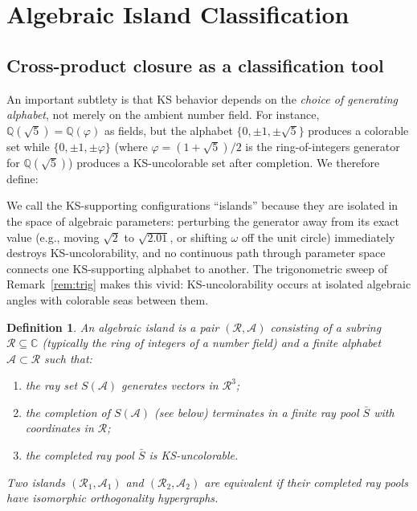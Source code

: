 \documentclass[12pt,a4paper]{article}
\newtheorem{definition}[theorem]{Definition}
\newcommand{\C}{\mathbb{C}}
\newcommand{\Q}{\mathbb{Q}}
\begin{document}
\section{Algebraic Island Classification}\label{sec:islands}

\subsection{Cross-product closure as a classification tool}\label{sec:closure}

An important subtlety is that KS behavior depends on the \emph{choice of generating alphabet}, not merely on the ambient number field. For instance, $\Q(\sqrt{5}) = \Q(\varphi)$ as fields, but the alphabet $\{0, \pm 1, \pm\sqrt{5}\}$ produces a colorable set while $\{0, \pm 1, \pm\varphi\}$ (where $\varphi = (1+\sqrt{5})/2$ is the ring-of-integers generator for $\Q(\sqrt{5})$) produces a KS-uncolorable set after completion. We therefore define:

We call the KS-supporting configurations ``islands'' because they are isolated in the space of algebraic parameters: perturbing the generator away from its exact value (e.g., moving $\sqrt{2}$ to $\sqrt{2.01}$, or shifting $\omega$ off the unit circle) immediately destroys KS-uncolorability, and no continuous path through parameter space connects one KS-supporting alphabet to another.  The trigonometric sweep of Remark~\ref{rem:trig} makes this vivid: KS-uncolorability occurs at isolated algebraic angles with colorable seas between them.

\begin{definition}
An \emph{algebraic island} is a pair $(\mathcal{R}, \mathcal{A})$ consisting of a subring $\mathcal{R} \subseteq \C$ (typically the ring of integers of a number field) and a finite alphabet $\mathcal{A} \subset \mathcal{R}$ such that:
\begin{enumerate}[label=(\roman*)]
    \item the ray set $S(\mathcal{A})$ generates vectors in $\mathcal{R}^3$;
    \item the completion of $S(\mathcal{A})$ (see below) terminates in a \emph{finite} ray pool $\bar{S}$ with coordinates in $\mathcal{R}$;
    \item the completed ray pool $\bar{S}$ is KS-uncolorable.
\end{enumerate}
Two islands $(\mathcal{R}_1, \mathcal{A}_1)$ and $(\mathcal{R}_2, \mathcal{A}_2)$ are \emph{equivalent} if their completed ray pools have isomorphic orthogonality hypergraphs.
\end{definition}
\end{document}
